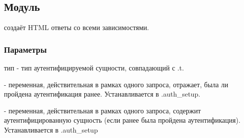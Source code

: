 \subsection{Модуль }\label{page-FPauth-responses-module-FPauth+u+responses-module-HTML-module-Make}%
 создаёт HTML ответы со всеми зависимостями.

\subsubsection{Параметры\label{parameters}}%
\label{page-FPauth-responses-module-FPauth+u+responses-module-HTML-module-Make-argument-1-V}\begin{ocamlindent}\label{page-FPauth-responses-module-FPauth+u+responses-module-HTML-module-Make-argument-1-V-type-entity}\begin{ocamlindent}тип  - тип аутентифицируемой сущности, совпадающий с .t.\end{ocamlindent}%
\medbreak
\label{page-FPauth-responses-module-FPauth+u+responses-module-HTML-module-Make-argument-1-V-val-authenticated}\begin{ocamlindent} - переменная, действительная в рамках одного запроса, отражает, была ли пройдена аутентификация ранее. Устанавливается в .auth\_setup.\end{ocamlindent}%
\medbreak
\label{page-FPauth-responses-module-FPauth+u+responses-module-HTML-module-Make-argument-1-V-val-current+u+user}\begin{ocamlindent} - переменная, действительная в рамках одного запроса, содержит аутентифицированную сущность (если ранее была пройдена аутентификация). Устанавливается в .auth\_setup\end{ocamlindent}%

\end{ocamlindent}
